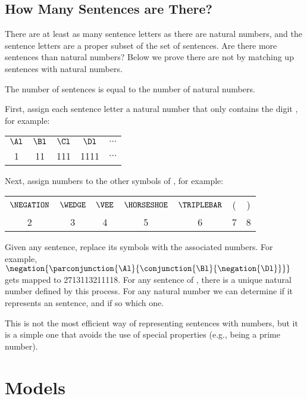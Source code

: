 \subsection{How Many \GSL{} Sentences are There?}
There are at least as many sentence letters as there are natural numbers, and the sentence letters are a proper subset of the set of sentences. 
Are there more sentences than natural numbers?  
Below we prove there are not by matching up sentences with natural numbers.
\begin{THEOREM}{}
The number of \GSL{} sentences is equal to the number of natural numbers.
\end{THEOREM}
\begin{PROOF}
First, assign each sentence letter a natural number that only contains the digit , for example:
\begin{center}
\begin{tabular}{ c c c c c }
$\Al$ & $\Bl$ & $\Cl$ & $\Dl$ & $\ldots$ \\
1 & 11 & 111 & 1111 & $\ldots$ \\
\end{tabular}
\end{center}
Next, assign numbers to the other symbols of \GSL{}, for example:
\begin{center}
\begin{tabular}{ c c c c c c c }
$\NEGATION$ & $\WEDGE$ & $\VEE$ & $\HORSESHOE$ & $\TRIPLEBAR$ & ( & ) \\
2 & 3 & 4 & 5 & 6 & 7 & 8 \\
\end{tabular}
\end{center}
Given any sentence, replace its symbols with the associated numbers.
For example, \mbox{$\negation{\parconjunction{\Al}{\conjunction{\Bl}{\negation{\Dl}}}}$} gets mapped to 2713113211118.
For any sentence of \GSL{}, there is a unique natural number defined by this process. 
For any natural number we can determine if it represents an \GSL{} sentence, and if so which one.
\end{PROOF}

\noindent{}This is not the most efficient way of representing sentences with numbers, but it is a simple one that avoids the use of special properties (e.g., being a prime number).


\section{Models}\label{Interpretations}

